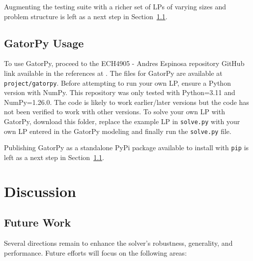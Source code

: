 \documentclass[conference]{IEEEtran}
\begin{document}
Augmenting the testing suite with a richer set of LPs of varying sizes and problem structure is left as a next step in Section~\ref{sss:future_work}.
\subsection{GatorPy Usage}
To use GatorPy, proceed to the ECH4905 - Andres Espinosa repository GitHub link available in the references at \cite{repo:ech4905}.
The files for GatorPy are available at \texttt{project/gatorpy}.
Before attempting to run your own LP, ensure a Python version with NumPy.
This repository was only tested with Python=3.11 and NumPy=1.26.0.
The code is likely to work earlier/later versions but the code has not been verified to work with other versions.
To solve your own LP with GatorPy, download this folder, replace the example LP in \texttt{solve.py} with your own LP entered in the GatorPy modeling and finally run the \texttt{solve.py} file.

Publishing GatorPy as a standalone PyPi package available to install with \texttt{pip} is left as a next step in Section~\ref{sss:future_work}.

\section{Discussion}
\label{sse:discussion}
\subsection{Future Work}
\label{sss:future_work}
Several directions remain to enhance the solver's robustness, generality, and performance. 
Future efforts will focus on the following areas:
\end{document}

